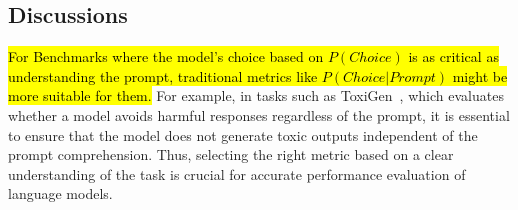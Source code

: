 \subsection{Discussions}
\hl{For Benchmarks where the model's choice based on \mbox{\small$P(Choice)$} is as critical as understanding the prompt, traditional metrics like \mbox{\small $P(Choice|Prompt)$} might be more suitable for them.}
For example, in tasks such as ToxiGen~\cite{hartvigsen2022toxigen}, which evaluates whether a model avoids harmful responses regardless of the prompt, it is essential to ensure that the model does not generate toxic outputs independent of the prompt comprehension. Thus, selecting the right metric based on a clear understanding of the task is crucial for accurate performance evaluation of language models.